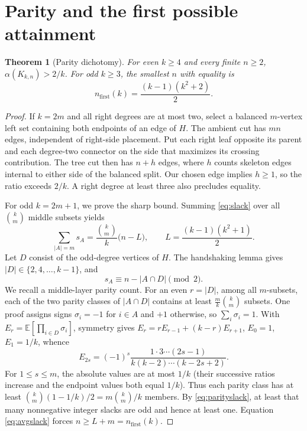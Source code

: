 \documentclass[11pt,a4paper]{article}
\newtheorem{theorem}{Theorem}[section]
\newcommand{\al}{\alpha}
\newcommand{\KK}[2]{K_{#1,#2}}
\begin{document}
\section{Parity and the first possible attainment}
\begin{theorem}[Parity dichotomy]\label{thm:parity}
For even $k\ge4$ and every finite $n\ge2$, $\al(\KK{k}{n})>2/k$. For odd $k\ge3$, the smallest $n$ with equality is
\begin{equation}\label{eq:first}
n_{\mathrm{first}}(k)=\frac{(k-1)(k^2+2)}2.
\end{equation}
\end{theorem}
\begin{proof}
If $k=2m$ and all right degrees are at most two, select a balanced $m$-vertex left set containing both endpoints of an edge of $H$. The ambient cut has $mn$ edges, independent of right-side placement. Put each right leaf opposite its parent and each degree-two connector on the side that maximizes its crossing contribution. The tree cut then has $n+h$ edges, where $h$ counts skeleton edges internal to either side of the balanced split. Our chosen edge implies $h\ge1$, so the ratio exceeds $2/k$. A right degree at least three also precludes equality.

For odd $k=2m+1$, we prove the sharp bound. Summing \eqref{eq:slack} over all $\binom{k}{m}$ middle subsets yields
\begin{equation}\label{eq:avgslack}
\sum_{|A|=m}s_A=\frac{\binom{k}{m}}{k}\bigl(n-L\bigr),\qquad L=\frac{(k-1)(k^2+1)}2.
\end{equation}
Let $D$ consist of the odd-degree vertices of $H$. The handshaking lemma gives $|D|\in\{2,4,\ldots,k-1\}$, and
\begin{equation}\label{eq:parityslack}
s_A\equiv n-|A\cap D|\pmod2.
\end{equation}
We recall a middle-layer parity count. For an even $r=|D|$, among all $m$-subsets, each of the two parity classes of $|A\cap D|$ contains at least $\frac{m}{k}\binom{k}{m}$ subsets. One proof assigns signs $\sigma_i=-1$ for $i\in A$ and $+1$ otherwise, so $\sum_i\sigma_i=1$. With $E_r=\mathbb E[\prod_{i\in D}\sigma_i]$, symmetry gives
$E_r=rE_{r-1}+(k-r)E_{r+1}$, $E_0=1$, $E_1=1/k$, whence
\[
E_{2s}=(-1)^s\frac{1\cdot3\cdots(2s-1)}{k(k-2)\cdots(k-2s+2)}.
\]
For $1\le s\le m$, the absolute values are at most $1/k$ (their successive ratios increase and the endpoint values both equal $1/k$). Thus each parity class has at least $\binom{k}{m}(1-1/k)/2=m\binom{k}{m}/k$ members. By \eqref{eq:parityslack}, at least that many nonnegative integer slacks are odd and hence at least one. Equation \eqref{eq:avgslack} forces $n\ge L+m=n_{\mathrm{first}}(k)$.


\end{proof}
\end{document}
